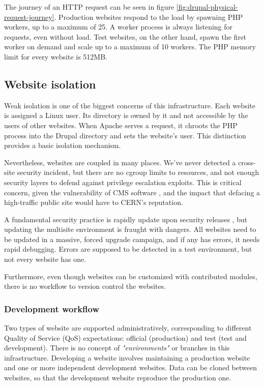 The journey of an HTTP request can be seen in figure \ref{fig:drupal-physical-request-journey}.
Production websites respond to the load by spawning PHP workers, up to a maximum of 25.
A worker process is always listening for requests, even without load.
Test websites, on the other hand, spawn the first worker on demand and scale up to a maximum of 10 workers.
The PHP memory limit for every website is 512MB.

\subsection{Website isolation}

Weak isolation is one of the biggest concerns of this infrastructure.
Each website is assigned a Linux user.
Its directory is owned by it and not accessible by the users of other websites.
When Apache serves a request, it chroots the PHP process into the Drupal directory and sets the website's user.
This distinction provides a basic isolation mechanism.

Nevertheless, websites are coupled in many places.
We've never detected a cross-site security incident,
but there are no cgroup limits to resources, and not enough security layers to defend against privilege escalation exploits.
This is critical concern, given the vulnerability of CMS software \cite{shteiman_why_2014},
and the impact that defacing a high-traffic public site would have to CERN's reputation.

A fundamental security practice is rapidly update upon security releases \cite{csontos_accessibility_2020},
but updating the multisite environment is fraught with dangers.
All websites need to be updated in a massive, forced upgrade campaign, and if any has errors, it needs rapid debugging.
Errors are supposed to be detected in a test environment, but not every website has one.

Furthermore, even though websites can be customized with contributed modules, there is no workflow to version control the websites.

\subsubsection*{Development workflow}

Two types of website are supported administratively, corresponding to different Quality of Service (QoS) expectations: official (production) and test (test and development).
There is no concept of \emph{"environments"} or branches in this infrastructure. Developing a website involves maintaining a production website and one or more independent development websites.
Data can be cloned between websites, so that the development website reproduce the production one.


